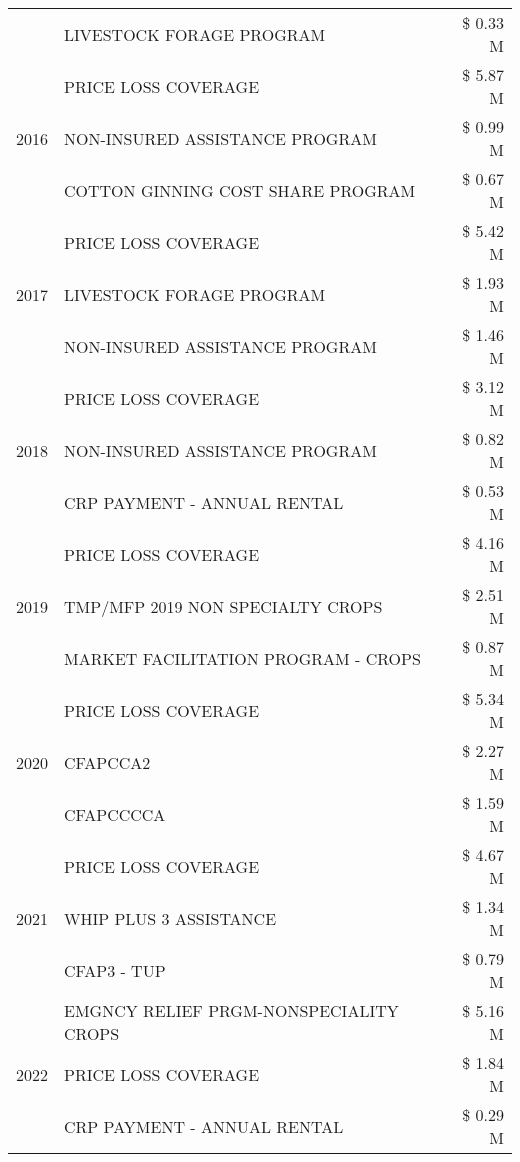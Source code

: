\begin{tabular}{llr}
 & LIVESTOCK FORAGE PROGRAM & \$ 0.33 M \\
\cline{1-3}
\multirow[t]{3}{*}{2016} & PRICE LOSS COVERAGE & \$ 5.87 M \\
 & NON-INSURED ASSISTANCE PROGRAM & \$ 0.99 M \\
 & COTTON GINNING COST SHARE PROGRAM & \$ 0.67 M \\
\cline{1-3}
\multirow[t]{3}{*}{2017} & PRICE LOSS COVERAGE & \$ 5.42 M \\
 & LIVESTOCK FORAGE PROGRAM & \$ 1.93 M \\
 & NON-INSURED ASSISTANCE PROGRAM & \$ 1.46 M \\
\cline{1-3}
\multirow[t]{3}{*}{2018} & PRICE LOSS COVERAGE & \$ 3.12 M \\
 & NON-INSURED ASSISTANCE PROGRAM & \$ 0.82 M \\
 & CRP PAYMENT - ANNUAL RENTAL & \$ 0.53 M \\
\cline{1-3}
\multirow[t]{3}{*}{2019} & PRICE LOSS COVERAGE & \$ 4.16 M \\
 & TMP/MFP 2019 NON SPECIALTY CROPS & \$ 2.51 M \\
 & MARKET FACILITATION PROGRAM - CROPS & \$ 0.87 M \\
\cline{1-3}
\multirow[t]{3}{*}{2020} & PRICE LOSS COVERAGE & \$ 5.34 M \\
 & CFAPCCA2 & \$ 2.27 M \\
 & CFAPCCCCA & \$ 1.59 M \\
\cline{1-3}
\multirow[t]{3}{*}{2021} & PRICE LOSS COVERAGE & \$ 4.67 M \\
 & WHIP PLUS 3 ASSISTANCE & \$ 1.34 M \\
 & CFAP3 - TUP & \$ 0.79 M \\
\cline{1-3}
\multirow[t]{3}{*}{2022} & EMGNCY RELIEF PRGM-NONSPECIALITY CROPS & \$ 5.16 M \\
 & PRICE LOSS COVERAGE & \$ 1.84 M \\
 & CRP PAYMENT - ANNUAL RENTAL & \$ 0.29 M \\
\cline{1-3}
\bottomrule
\end{tabular}
